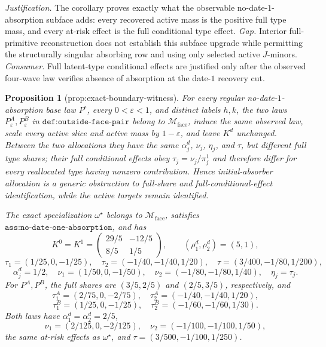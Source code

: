 \documentclass{article}
\newtheorem{proposition}{Proposition}
\begin{document}
\par\smallskip\noindent \textit{Justification.} The corollary proves exactly what the observable no-date-\(1\)-absorption subface adds: every recovered active mass is the positive full type mass, and every at-risk effect is the full conditional type effect. \textit{Gap.} Interior full-primitive reconstruction does not establish this subface upgrade while permitting the structurally singular absorbing row and using only selected active \(J\)-minors. \textit{Consumer.} Full latent-type conditional effects are justified only after the observed four-wave law verifies absence of absorption at the date-\(1\) recovery cut.

\begin{proposition}[prop:exact-boundary-witness]\label{prop:exact-boundary-witness}
For every regular no-date-\(1\)-absorption base law \(P^\circ\), every \(0<\varepsilon<1\), and distinct labels \(h,k\), the two laws \(P_\varepsilon^A,P_\varepsilon^B\) in \(\texttt{def:outside-face-pair}\) belong to \(\mathcal M_{\mathrm{face}}\), induce the same observed law, scale every active slice and active mass by \(1-\varepsilon\), and leave \(K^d\) unchanged. Between the two allocations they have the same \(\alpha_j^d\), \(\nu_j\), \(\eta_j\), and \(\tau\), but different full type shares; their full conditional effects obey \(\tau_j=\nu_j/\pi_j^1\) and therefore differ for every reallocated type having nonzero contribution. Hence initial-absorber allocation is a generic obstruction to full-share and full-conditional-effect identification, while the active targets remain identified.

The exact specialization \(\omega^\star\) belongs to \(\mathcal M_{\mathrm{face}}\), satisfies \(\texttt{ass:no-date-one-absorption}\), and has
\[
K^0=K^1=\begin{pmatrix}29/5&-12/5\\8/5&1/5\end{pmatrix},
\qquad (\rho_1^d,\rho_2^d)=(5,1),
\]
\[
\tau_1=(1/25,0,-1/25),\quad
\tau_2=(-1/40,-1/40,1/20),\quad
\tau=(3/400,-1/80,1/200),
\]
\[
\alpha_j^d=1/2,\quad
\nu_1=(1/50,0,-1/50),\quad
\nu_2=(-1/80,-1/80,1/40),\quad \eta_j=\tau_j.
\]
For \(P^A,P^B\), the full shares are \((3/5,2/5)\) and \((2/5,3/5)\), respectively, and
\[
\tau_1^A=(2/75,0,-2/75),\quad \tau_2^A=(-1/40,-1/40,1/20),
\]
\[
\tau_1^B=(1/25,0,-1/25),\quad \tau_2^B=(-1/60,-1/60,1/30).
\]
Both laws have \(\alpha_1^d=\alpha_2^d=2/5\),
\[
\nu_1=(2/125,0,-2/125),\quad
\nu_2=(-1/100,-1/100,1/50),
\]
the same at-risk effects as \(\omega^\star\), and \(\tau=(3/500,-1/100,1/250)\).
\end{proposition}
\end{document}
